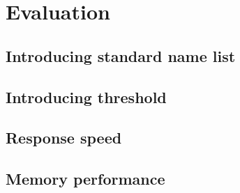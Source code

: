 \chapter{Evaluation}
\label{ch:evaluation}

\section{Introducing standard name list}

\section{Introducing threshold}

\section{Response speed}

\section{Memory performance}
